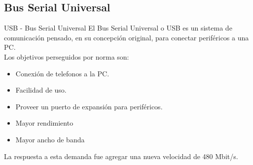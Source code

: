 \documentclass[11pt,a4paper]{beamer}
\begin{document}
		\subsection{Bus Serial Universal}
			\begin{frame}{USB - Bus Serial Universal}
					El Bus Serial Universal o USB es un sistema de comunicación pensado, en su concepción original, para conectar periféricos a una PC.\\
					Los objetivos perseguidos por norma son:

				\begin{itemize}
					\item Conexión de telefonos a la PC.
					\item Facilidad de uso.
					\item Proveer un puerto de expansión para periféricos.
					\item<2-> \alert {Mayor rendimiento}
					\item<2-> \alert {Mayor ancho de banda}
				\end{itemize}
				
				 {La respuesta a esta demanda fue agregar una nueva velocidad de 480 Mbit/s.}
				
			\end{frame}
\end{document}
